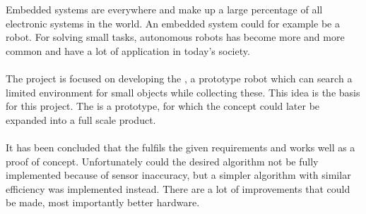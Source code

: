 Embedded systems are everywhere and make up a large percentage of all electronic systems in the world. An embedded system could for example be a robot. For solving small tasks, autonomous robots has become more and more common and have a lot of application in today's society.
\\\\
The project is focused on developing the \projname{}, a prototype robot which can search a limited environment for small objects while collecting these. This idea is the basis for this project. The \projname{} is a prototype, for which the concept could later be expanded into a full scale product.
\\\\
It has been concluded that the \projname{} fulfils the given requirements and works well as a proof of concept. Unfortunately could the desired algorithm not be fully implemented because of sensor inaccuracy, but a simpler algorithm with similar efficiency was implemented instead. There are a lot of improvements that could be made, most importantly better hardware.
